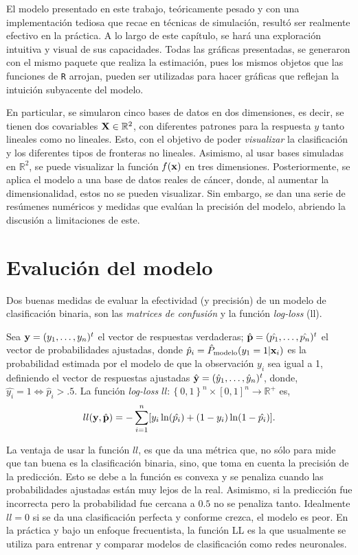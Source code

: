 \documentclass[../Main/Main.tex]{subfiles}
\begin{document}
El modelo presentado en este trabajo, teóricamente pesado y con una implementación tediosa que recae en técnicas de simulación, resultó ser realmente efectivo en la práctica. A lo largo de este capítulo, se hará una exploración intuitiva y visual de sus capacidades. Todas las gráficas presentadas, se generaron con el mismo paquete que realiza la estimación, pues los mismos objetos que las funciones de \verb|R| arrojan, pueden ser utilizadas para hacer gráficas que reflejan la intuición subyacente del modelo. 

En particular, se simularon cinco bases de datos en dos dimensiones, es decir, se tienen dos covariables $\mathbf{X}\in\mathbb{R}^2$,  con diferentes patrones para la respuesta $y$ tanto lineales como no lineales. Esto, con el objetivo de poder \textit{visualizar} la clasificación y los diferentes tipos de fronteras no lineales. Asimismo, al usar bases simuladas en $\mathbb{R}^2$, se puede visualizar la función $f(\mathbf{x})$ en tres dimensiones. Posteriormente, se aplica el modelo a una base de datos reales de cáncer, donde, al aumentar la dimensionalidad, estos no se pueden visualizar. Sin embargo, se dan una serie de resúmenes numéricos y medidas que evalúan la precisión del modelo, abriendo la discusión a limitaciones de este. 

\section{Evalución del modelo}
Dos buenas medidas de evaluar la efectividad (y precisión) de un modelo de clasificación binaria, son las \textit{matrices de confusión} y la función \textit{log-loss} (ll).

Sea $\mathbf{y} = (y_1,\ldots,y_n)^t$ el vector de respuestas verdaderas; $\hat{\mathbf{p}} = (\hat{p_1},\ldots,\hat{p_n})^t$ el vector de probabilidades ajustadas, donde $\hat{p}_i = \hat{P}_{\text{modelo}}(y_1 = 1|\mathbf{x}_i)$ es la probabilidad estimada por el modelo de que la observación $y_i$ sea igual a 1, definiendo el vector de respuestas ajustadas $\hat{\mathbf{y}} = (\hat{y}_1,\ldots,\hat{y}_n)^t$, donde, $\hat{y_i} = 1 \iff \hat{p}_i > .5$. La función \textit{log-loss} $ll:\left\{0,1\right\}^n\times[0,1]^n\rightarrow \mathbb{R}^+$ es,
\begin{align}
	ll(\mathbf{y},\hat{\mathbf{p}}) = -\sum_{i = 1}^n[ y_i \ln(\hat{p_i}) + (1-y_i)\ln(1-\hat{p_i})]. \label{ec:LogLoss}
\end{align}

La ventaja de usar la función $ll$, es que da una métrica que, no sólo para mide que tan buena es la clasificación binaria, sino, que toma en cuenta la precisión de la predicción. Esto se debe a la función es convexa y se penaliza cuando las probabilidades ajustadas están muy lejos de la real. Asimismo, si la predicción fue incorrecta pero la probabilidad fue cercana a $0.5$ no se penaliza tanto. Idealmente $ll = 0$ si se da una clasificación perfecta y conforme crezca, el modelo es peor. En la práctica y bajo un enfoque frecuentista, la función LL es la que usualmente se utiliza para entrenar y comparar modelos de clasificación como redes neuronales.
\end{document}

